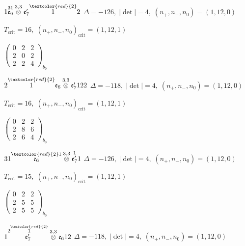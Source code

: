 \documentclass[10pt]{article}
\begin{document}
$1\overset{31}{\mathfrak{e}_6}\overset{3,3}{\otimes}\mathfrak{e}_7'\overset{\textcolor{red}{2}}{1}2$ \quad $\Delta=-126,\; |\det|=4,\; (n_+,n_-,n_0)=(1,12,0)$

\hspace{1em}$T_{\text{crit}}=16,\; (n_+,n_-,n_0)_{\text{crit}}=(1,12,1)$

\hspace{2em}$\left(\begin{smallmatrix}0 & 2 & 2 \\ 2 & 0 & 2 \\ 2 & 2 & 4\end{smallmatrix}\right)_{\!b_0}$

\smallskip

$2\overset{\textcolor{red}{2}}{1}\mathfrak{e}_6\overset{3,3}{\otimes}\mathfrak{e}_7'122$ \quad $\Delta=-118,\; |\det|=4,\; (n_+,n_-,n_0)=(1,12,0)$

\hspace{1em}$T_{\text{crit}}=16,\; (n_+,n_-,n_0)_{\text{crit}}=(1,12,1)$

\hspace{2em}$\left(\begin{smallmatrix}0 & 2 & 2 \\ 2 & 8 & 6 \\ 2 & 6 & 4\end{smallmatrix}\right)_{\!b_0}$

\smallskip

$31\overset{\textcolor{red}{2}1}{\mathfrak{e}_6}\overset{3,3}{\otimes}\overset{1}{\mathfrak{e}_7'}1$ \quad $\Delta=-126,\; |\det|=4,\; (n_+,n_-,n_0)=(1,12,0)$

\hspace{1em}$T_{\text{crit}}=15,\; (n_+,n_-,n_0)_{\text{crit}}=(1,12,1)$

\hspace{2em}$\left(\begin{smallmatrix}0 & 2 & 2 \\ 2 & 5 & 5 \\ 2 & 5 & 5\end{smallmatrix}\right)_{\!b_0}$

\smallskip

$1\overset{2\overset{\textcolor{red}{2}}{1}}{\mathfrak{e}_7'}\overset{3,3}{\otimes}\mathfrak{e}_612$ \quad $\Delta=-118,\; |\det|=4,\; (n_+,n_-,n_0)=(1,12,0)$
\end{document}
